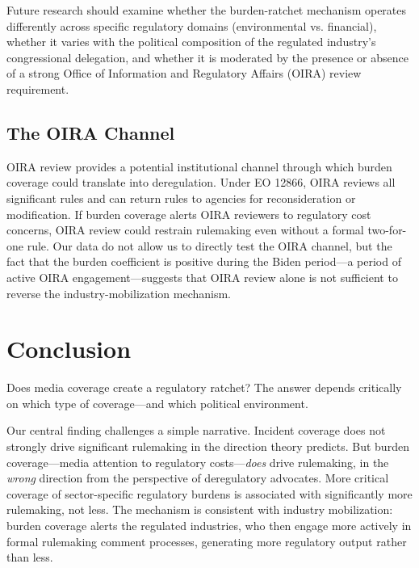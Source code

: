 \documentclass[12pt]{article}
\begin{document}
Future research should examine whether the burden-ratchet mechanism operates differently across specific regulatory domains (environmental vs. financial), whether it varies with the political composition of the regulated industry's congressional delegation, and whether it is moderated by the presence or absence of a strong Office of Information and Regulatory Affairs (OIRA) review requirement.

\subsection{The OIRA Channel}

OIRA review provides a potential institutional channel through which burden coverage could translate into deregulation. Under EO 12866, OIRA reviews all significant rules and can return rules to agencies for reconsideration or modification. If burden coverage alerts OIRA reviewers to regulatory cost concerns, OIRA review could restrain rulemaking even without a formal two-for-one rule. Our data do not allow us to directly test the OIRA channel, but the fact that the burden coefficient is positive during the Biden period---a period of active OIRA engagement---suggests that OIRA review alone is not sufficient to reverse the industry-mobilization mechanism.

\section{Conclusion}
\label{sec:conclusion}

Does media coverage create a regulatory ratchet? The answer depends critically on which type of coverage---and which political environment.

Our central finding challenges a simple narrative. Incident coverage does not strongly drive significant rulemaking in the direction theory predicts. But burden coverage---media attention to regulatory costs---\emph{does} drive rulemaking, in the \emph{wrong} direction from the perspective of deregulatory advocates. More critical coverage of sector-specific regulatory burdens is associated with significantly more rulemaking, not less. The mechanism is consistent with industry mobilization: burden coverage alerts the regulated industries, who then engage more actively in formal rulemaking comment processes, generating more regulatory output rather than less.
\end{document}
